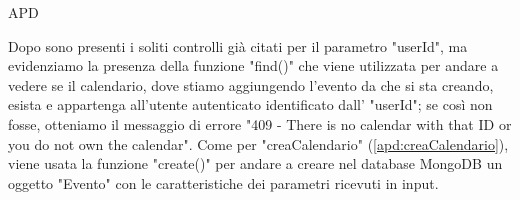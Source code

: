\begin{listaPersonale} {APD}
\begin{listaPersonale2}[APD]{}
                Dopo sono presenti i soliti controlli già citati per il parametro "userId", ma evidenziamo la presenza della funzione "find()" che viene utilizzata per andare a vedere se il calendario, dove stiamo aggiungendo l'evento da che si sta creando, esista e appartenga all'utente autenticato identificato dall' "userId"; se così non fosse, otteniamo il messaggio di errore  "409 - There is no calendar with that ID or you do not own the calendar". Come per "creaCalendario" (\ref{apd:creaCalendario}), viene usata la funzione "create()" per andare a creare nel database MongoDB un oggetto "Evento" con le caratteristiche dei parametri ricevuti in input.

\end{listaPersonale2}
\end{listaPersonale}
